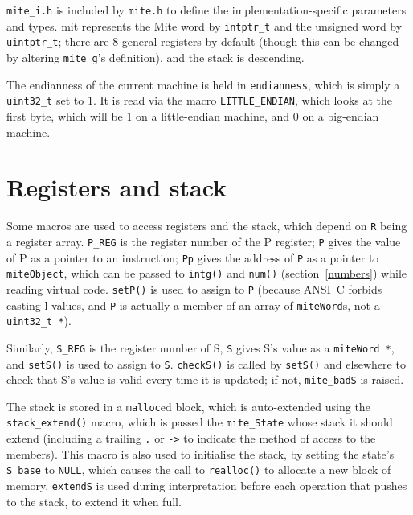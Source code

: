 \documentclass[english]{scrartcl}
\newcommand{\absfont}{\sffamily}
\newcommand{\abs}[1]{{\absfont #1}}
\begin{document}
\verb|mite_i.h| is included by \verb|mite.h| to define the implementation-specific
parameters and types. mit represents the Mite word by \verb|intptr_t| and the
unsigned word by \verb|uintptr_t|; there are $8$ general registers by default
(though this can be changed by altering \verb|mite_g|'s definition), and the
stack is descending.

The endianness of the current machine is held in \verb|endianness|, which is
simply a \verb|uint32_t| set to $1$. It is read via the macro \verb|LITTLE_ENDIAN|,
which looks at the first byte, which will be $1$ on a little-endian machine,
and $0$ on a big-endian machine.



\section{Registers and stack}

Some macros are used to access registers and the stack, which depend on \verb|R|
being a register array. \verb|P_REG| is the register number of the \abs{P}
register; \verb|P| gives the value of \abs{P} as a pointer to an instruction;
\verb|Pp| gives the address of \verb|P| as a pointer to \verb|miteObject|, which can be
passed to \verb|intg()| and \verb|num()| (section~\ref{numbers}) while reading virtual
code. \verb|setP()| is used to assign to \verb|P| (because ANSI~C forbids casting
l-values, and \verb|P| is actually a member of an array of \verb|miteWord|s, not a
\verb|uint32_t *|).

Similarly, \verb|S_REG| is the register number of \abs{S}, \verb|S| gives \abs{S}'s
value as a \verb|miteWord *|, and \verb|setS()| is used to assign to \verb|S|. \verb|checkS()|
is called by \verb|setS()| and elsewhere to check that \abs{S}'s value is valid
every time it is updated; if not, \verb|mite_badS| is raised.

The stack is stored in a \verb|malloc|ed block, which is auto-extended using the
\verb|stack_extend()| macro, which is passed the \verb|mite_State| whose stack it
should extend (including a trailing \verb|.| or \verb|->| to indicate the method of
access to the members). This macro is also used to initialise the stack, by
setting the state's \verb|S_base| to \verb|NULL|, which causes the call to \verb|realloc()|
to allocate a new block of memory. \verb|extendS| is used during interpretation
before each operation that pushes to the stack, to extend it when full.
\end{document}
